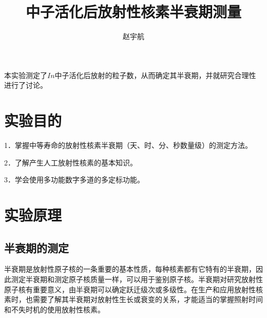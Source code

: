 \documentclass[hyperref]{ctexart}
\title{\textbf{中子活化后放射性核素半衰期测量}}
\author{\sffamily 赵宇航}
\date{}
\begin{document}
\maketitle
{}本实验测定了$In$中子活化后放射的粒子数，从而确定其半衰期，并就研究合理性进行了讨论。\\	
\begin{multicols}{2}
	\section{实验目的}
	1．掌握中等寿命的放射性核素半衰期（天、时、分、秒数量级）的测定方法。

	2．了解产生人工放射性核素的基本知识。

	3．学会使用多功能数字多道的多定标功能。
	\section{实验原理}
	\subsection{半衰期的测定}
	半衰期是放射性原子核的一条重要的基本性质，每种核素都有它特有的半衰期，因此测定半衰期和测定原子核质量一样，可以用于鉴别原子核。半衰期对研究放射性原子核有重要意义，由半衰期可以确定跃迁级次或多级性。在生产和应用放射性核素时，也需要了解其半衰期对放射性生长或衰变的关系，才能适当的掌握照射时间和不失时机的使用放射性核素。


\end{multicols}
\end{document}
